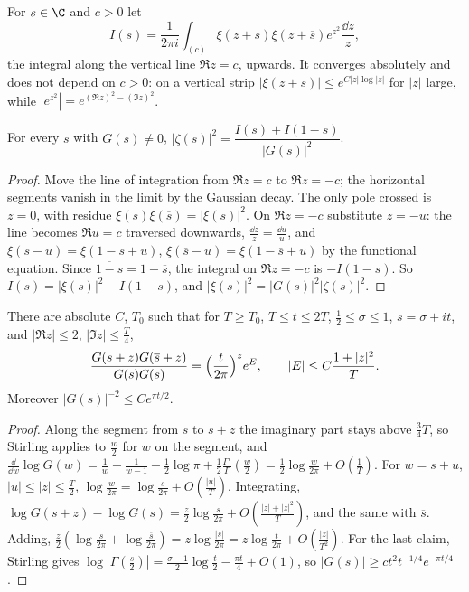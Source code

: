 For $s\in\C$ and $c>0$ let
\[
I(s)=\frac1{2\pi i}\int_{(c)}\xi(z+s)\xi(z+\overline s)e^{z^2}\frac{\dd z}z,
\]
the integral along the vertical line $\Re z=c$, upwards. It converges absolutely and does not depend on $c>0$: on a vertical strip $|\xi(z+s)|\le e^{C|z|\log|z|}$ for $|z|$ large, while $|e^{z^2}|=e^{(\Re z)^2-(\Im z)^2}$.

\begin{lemma}\label{lem:exactmod}
For every $s$ with $G(s)\ne0$, $|\zeta(s)|^2=\dfrac{I(s)+I(1-s)}{|G(s)|^2}$.
\end{lemma}
\begin{proof}
Move the line of integration from $\Re z=c$ to $\Re z=-c$; the horizontal segments vanish in the limit by the Gaussian decay. The only pole crossed is $z=0$, with residue $\xi(s)\xi(\overline s)=|\xi(s)|^2$. On $\Re z=-c$ substitute $z=-u$: the line becomes $\Re u=c$ traversed downwards, $\frac{\dd z}z=\frac{\dd u}u$, and $\xi(s-u)=\xi(1-s+u)$, $\xi(\overline s-u)=\xi(1-\overline s+u)$ by the functional equation. Since $\overline{1-s}=1-\overline s$, the integral on $\Re z=-c$ is $-I(1-s)$. So $I(s)=|\xi(s)|^2-I(1-s)$, and $|\xi(s)|^2=|G(s)|^2|\zeta(s)|^2$.
\end{proof}

\begin{lemma}\label{lem:gammaratio}
There are absolute $C$, $T_0$ such that for $T\ge T_0$, $T\le t\le2T$, $\frac12\le\sigma\le1$, $s=\sigma+it$, and $|\Re z|\le2$, $|\Im z|\le\frac T4$,
\[
\frac{G(s+z)G(\overline s+z)}{G(s)G(\overline s)}=\Bigl(\frac t{2\pi}\Bigr)^ze^{E},\qquad|E|\le C\frac{1+|z|^2}T.
\]
Moreover $|G(s)|^{-2}\le Ce^{\pi t/2}$.
\end{lemma}
\begin{proof}
Along the segment from $s$ to $s+z$ the imaginary part stays above $\frac34T$, so Stirling applies to $\frac w2$ for $w$ on the segment, and $\frac{\dd}{\dd w}\log G(w)=\frac1w+\frac1{w-1}-\frac12\log\pi+\frac12\frac{\Gamma'}\Gamma(\frac w2)=\frac12\log\frac w{2\pi}+O(\frac1T)$. For $w=s+u$, $|u|\le|z|\le\frac T2$, $\log\frac w{2\pi}=\log\frac s{2\pi}+O(\frac{|u|}T)$. Integrating, $\log G(s+z)-\log G(s)=\frac z2\log\frac s{2\pi}+O(\frac{|z|+|z|^2}T)$, and the same with $\overline s$. Adding, $\frac z2(\log\frac s{2\pi}+\log\frac{\overline s}{2\pi})=z\log\frac{|s|}{2\pi}=z\log\frac t{2\pi}+O(\frac{|z|}{T^2})$. For the last claim, Stirling gives $\log|\Gamma(\frac s2)|=\frac{\sigma-1}2\log\frac t2-\frac{\pi t}4+O(1)$, so $|G(s)|\ge ct^2t^{-1/4}e^{-\pi t/4}$.
\end{proof}

